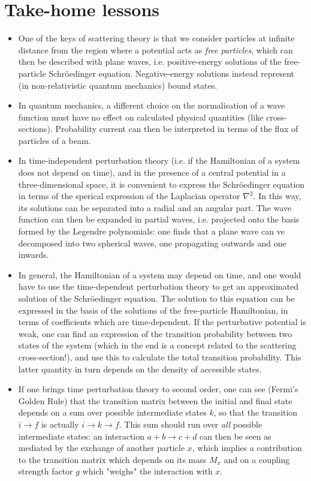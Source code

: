 \section*{Take-home lessons}
\begin{itemize}
    \item One of the keys of scattering theory is that we consider particles at infinite distance from the region where a potential acts as \emph{free particles}, which can then be described with plane waves, i.e. positive-energy solutions of the free-particle Schr\"oedinger equation. Negative-energy solutions instead represent (in non-relativistic quantum mechanics) bound states.
    \item In quantum mechanics, a different choice on the normalisation of a wave function must have no effect on calculated physical quantities (like cross-sections). Probability current can then be interpreted in terms of the flux of particles of a beam.
    \item In time-independent perturbation theory (i.e. if the Hamiltonian of a system does not depend on time), and in the presence of a central potential in a three-dimensional space, it is convenient to express the Schr\"oedinger equation in terms of the sperical expression of the Laplacian operator $\nabla^2$. In this way, its solutions can be separated into a radial and an angular part. The wave function can then be expanded in partial waves, i.e. projected onto the basis formed by the Legendre polynomials: one finds that a plane wave can ve decomposed into two spherical waves, one propagating outwards and one inwards. 
    \item In general, the Hamiltonian of a system may depend on time, and one would have to use the time-dependent perturbation theory to get an approximated solution of the Schr\"oedinger equation. The solution to this equation can be expressed in the basis of the solutions of the free-particle Hamiltonian, in terms of coefficients which are time-dependent. If the perturbative potential is weak, one can find an expression of the transition probability between two states of the system (which in the end is a concept related to the scattering cross-section!), and use this to calculate the total transition probability. This latter quantity in turn depends on the density of accessible states.
    \item If one brings time perturbation theory to second order, one can see (Fermi's Golden Rule) that the transition matrix between the initial and final state depends on a sum over possible intermediate states $k$, so that the transition $i\to f$ is actually $i\to k \to f$. This sum should run over \emph{all} possible intermediate states: an interaction $a+b\to c+d$ can then be seen as mediated by the exchange of another particle $x$, which implies a contribution to the transition matrix which depends on its mass $M_x$ and on a coupling strength factor $g$ which "weighs" the interaction with $x$.

\end{itemize}
